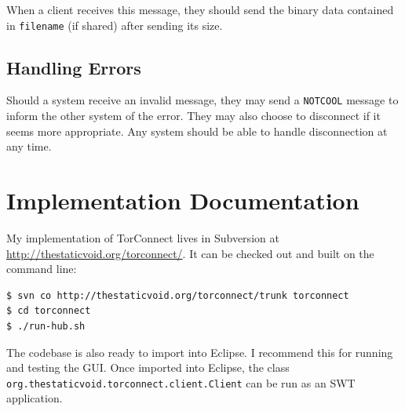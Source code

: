 \documentclass{article}
\begin{document}
When a client receives this message, they should send the binary data contained in \verb+filename+ (if shared) after sending its size.

\subsection{Handling Errors}
Should a system receive an invalid message, they may send a \verb+NOTCOOL+ message to inform the other system of the error.  They may also choose to disconnect if it seems more appropriate.  Any system should be able to handle disconnection at any time.

\newpage
\section{Implementation Documentation}
My implementation of TorConnect lives in Subversion at \url{http://thestaticvoid.org/torconnect/}.  It can be checked out and built on the command line:

\begin{verbatim}
$ svn co http://thestaticvoid.org/torconnect/trunk torconnect
$ cd torconnect
$ ./run-hub.sh
\end{verbatim}

The codebase is also ready to import into Eclipse.  I recommend this for running and testing the GUI.  Once imported into Eclipse, the class \texttt{org\-.the\-static\-void\-.tor\-connect\-.client\-.Client} can be run as an SWT application.
\end{document}
